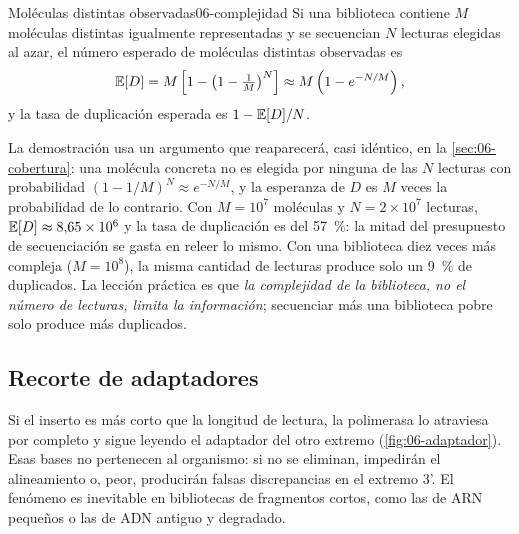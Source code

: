 \begin{teorema}{Moléculas distintas observadas}{06-complejidad}
Si una biblioteca contiene $M$ moléculas distintas igualmente representadas y se secuencian $N$ lecturas elegidas al azar, el número esperado de moléculas distintas observadas es
\begin{equation}\label{eq:06-complejidad}
\mathbb{E}[D] = M\left[1-\left(1-\tfrac{1}{M}\right)^{N}\right] \approx M\left(1-e^{-N/M}\right),
\end{equation}
y la tasa de duplicación esperada es $1-\mathbb{E}[D]/N$.
\end{teorema}

\begin{simbolos}
\end{simbolos}

La demostración usa un argumento que reaparecerá, casi idéntico, en la \cref{sec:06-cobertura}: una molécula concreta no es elegida por ninguna de las $N$ lecturas con probabilidad $(1-1/M)^N\approx e^{-N/M}$, y la esperanza de $D$ es $M$ veces la probabilidad de lo contrario. Con $M=10^7$ moléculas y $N=2\times10^7$ lecturas, $\mathbb{E}[D]\approx8{,}65\times10^6$ y la tasa de duplicación es del \SI{57}{\percent}: la mitad del presupuesto de secuenciación se gasta en releer lo mismo. Con una biblioteca diez veces más compleja ($M=10^8$), la misma cantidad de lecturas produce solo un \SI{9}{\percent} de duplicados. La lección práctica es que \emph{la complejidad de la biblioteca, no el número de lecturas, limita la información}; secuenciar más una biblioteca pobre solo produce más duplicados.

\subsection{Recorte de adaptadores}

Si el inserto es más corto que la longitud de lectura, la polimerasa lo atraviesa por completo y sigue leyendo el adaptador del otro extremo (\cref{fig:06-adaptador}). Esas bases no pertenecen al organismo: si no se eliminan, impedirán el alineamiento o, peor, producirán falsas discrepancias en el extremo 3'. El fenómeno es inevitable en bibliotecas de fragmentos cortos, como las de ARN pequeños o las de ADN antiguo y degradado.

